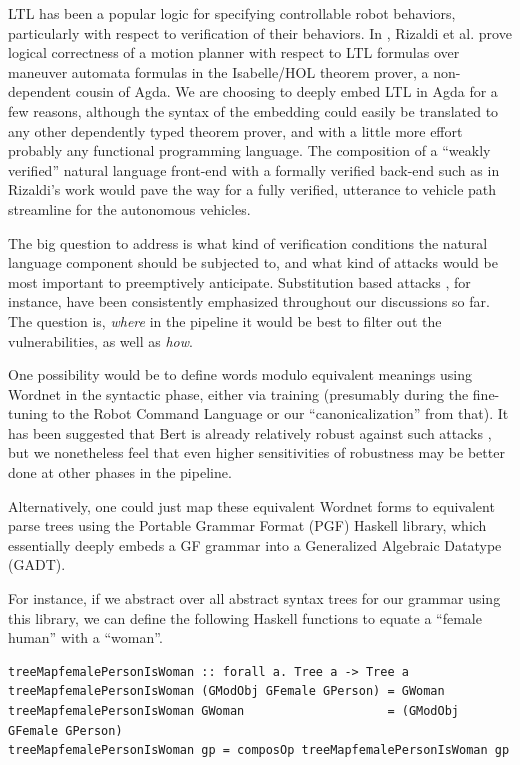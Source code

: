\documentclass[a4paper, 11pt]{article}
\begin{document}
LTL has been a popular logic for specifying controllable robot behaviors,
particularly with respect to verification of their behaviors. In
\cite{verifiedMotion}, Rizaldi et al. prove logical correctness of a motion
planner with respect to LTL formulas over maneuver automata formulas in the
Isabelle/HOL theorem prover, a non-dependent cousin of Agda. We are choosing to
deeply embed LTL in Agda for a few reasons, although the syntax of the embedding
could easily be translated to any other dependently typed theorem prover, and
with a little more effort probably any functional programming language. The
composition of a ``weakly verified'' natural language front-end with a formally
verified back-end such as in Rizaldi's work would pave the way for a fully
verified, utterance to vehicle path streamline for the autonomous vehicles.

The big question to address is what kind of verification conditions the natural
language component should be subjected to, and what kind of attacks would be
most important to preemptively anticipate. Substitution based attacks
\cite{substAttacks}, for instance, have been consistently emphasized throughout
our discussions so far. The question is, \emph{where} in the pipeline it would
be best to filter out the vulnerabilities, as well as \emph{how}.

One possibility would be to define words modulo equivalent meanings using
Wordnet \cite{wordnet} in the syntactic phase, either via training
\cite{ren-etal-2019-generating} (presumably during the fine-tuning to the Robot
Command Language or our ``canonicalization'' from that). It has been suggested
that Bert is already relatively robust against such attacks
\cite{hauser2021bert}, but we nonetheless feel that even higher sensitivities of
robustness may be better done at other phases in the pipeline.

Alternatively, one could just map these equivalent Wordnet forms to equivalent
parse trees using the Portable Grammar Format (PGF) Haskell library, which
essentially deeply embeds a GF grammar into a Generalized Algebraic Datatype
(GADT).

For instance, if we abstract over all abstract syntax trees for our grammar
using this library, we can define the following Haskell functions to equate a
``female human'' with a ``woman''. 

\begin{verbatim}
treeMapfemalePersonIsWoman :: forall a. Tree a -> Tree a
treeMapfemalePersonIsWoman (GModObj GFemale GPerson) = GWoman
treeMapfemalePersonIsWoman GWoman                    = (GModObj GFemale GPerson)
treeMapfemalePersonIsWoman gp = composOp treeMapfemalePersonIsWoman gp
\end{verbatim}
\end{document}
